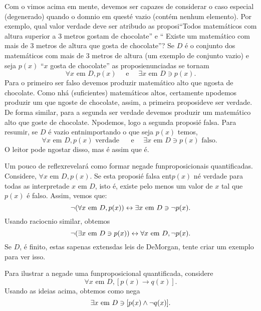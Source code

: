 Com o vimos acima em mente, devemos ser capazes de considerar o caso especial (degenerado) quando o dom\ih nio em quest\ao \'e vazio (cont\'em nenhum elemento). Por exemplo, qual valor verdade deve ser atribu\ih do as proposi\coes ``Todos matem\'aticos com altura superior a 3 metros gostam de chocolate'' e `` Existe um matem\'atico com mais de 3 metros de altura que gosta de chocolate''? Se $D$ \'e o conjunto dos matem\'aticos com mais de 3 metros de altura (um exemplo de conjunto vazio) e seja $p(x)$ ``$x$ gosta de chocolate'' as proposi\coes enunciadas se tornam 
\[
\forall x \textrm{ em } D, p(x) \quad \textrm{ e } \quad \exists x \textrm{ em } D \ni p(x).
\]
Para o primeiro ser falso devemos produzir matem\'atico alto que n\ao gosta de chocolate. Como n\ao h\'a (suficientes) matem\'aticos altos, certamente n\ao podemos produzir um que n\ao goste de chocolate, assim, a primeira proposi\cao deve ser verdade. De forma similar, para a segunda ser verdade devemos produzir um matem\'atico alto que goste de chocolate. N\ao podemos, logo a segunda proposi\cao \'e falsa. Para resumir, se $D$ \'e vazio ent\ao n\ao importando o que seja $p(x)$ temos,
\[
\forall x \textrm{ em } D, p(x) \textrm{ verdade } \quad \textrm{ e } \quad \exists x \textrm{ em } D \ni p(x) \textrm{ falso. }
\]
O leitor pode n\ao gostar disso, mas \'e assim que \'e.

Um pouco de reflex\ao revelar\'a como formar nega\coes de fun\coes proposicionais quantificadas. Considere, $\forall x \textrm{ em } D, p(x)$. Se esta proposi\cao \'e falsa ent\ao $p(x)$ n\ao \'e verdade para todas as interpreta\coes de $x$ em $D$, isto \'e, existe pelo menos um valor de $x$ tal que $p(x)$ \'e falso. Assim, vemos que:
\[
\lnot(\forall x \textrm{ em } D, p(x))\leftrightarrow \exists x \textrm{ em } D \ni \lnot p(x).
\]
Usando racioc\ih nio similar, obtemos 
\[
\lnot(\exists x \textrm{ em } D \ni p(x))\leftrightarrow \forall x \textrm{ em } D, \lnot p(x).
\]
Se $D$, \'e finito, estas s\ao apenas extens\oes das leis de DeMorgan, tente criar um exemplo para ver isso.

Para ilustrar a nega\cao de uma fun\cao proposicional quantificada, considere
\[
\forall x \textrm{ em } D, [p(x)\to q(x)].
\]
Usando as ideias acima, obtemos como nega\cao
\[
\exists x \textrm{ em } D \ni [p(x) \wedge \lnot q(x)].
\]

